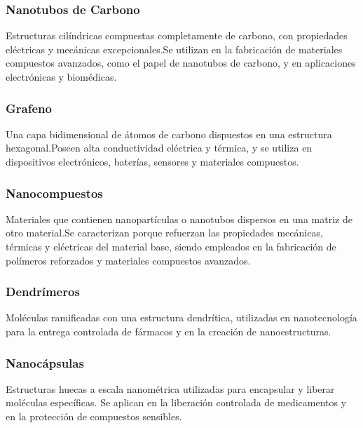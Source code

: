     \subsubsection{Nanotubos de Carbono}
    Estructuras cilíndricas compuestas completamente de carbono, con propiedades eléctricas y mecánicas excepcionales.Se utilizan en la fabricación de materiales compuestos avanzados, como el papel de nanotubos de carbono, y en aplicaciones electrónicas y biomédicas.
    \subsubsection{Grafeno}
    Una capa bidimensional de átomos de carbono dispuestos en una estructura hexagonal.Poseen alta conductividad eléctrica y térmica, y se utiliza en dispositivos electrónicos, baterías, sensores y materiales compuestos.
    \subsubsection{Nanocompuestos}
    Materiales que contienen nanopartículas o nanotubos dispersos en una matriz de otro material.Se caracterizan porque refuerzan las propiedades mecánicas, térmicas y eléctricas del material base, siendo empleados en la fabricación de polímeros reforzados y materiales compuestos avanzados.
    \subsubsection{Dendrímeros}
    Moléculas ramificadas con una estructura dendrítica, utilizadas en nanotecnología para la entrega controlada de fármacos y en la creación de nanoestructuras.
    \subsubsection{Nanocápsulas}
    Estructuras huecas a escala nanométrica utilizadas para encapsular y liberar moléculas específicas. Se aplican en la liberación controlada de medicamentos y en la protección de compuestos sensibles.
